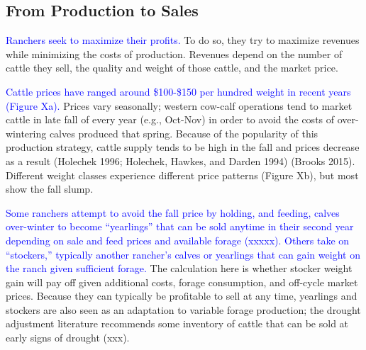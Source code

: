 \documentclass[11pt]{article}
\begin{document}
\subsection{From Production to Sales}
\textcolor{blue}{Ranchers seek to maximize their profits.}
 To do so, they try to maximize revenues while minimizing the costs of production. Revenues depend on the number of cattle they sell, the quality and weight of those cattle, and the market price. 
 
\textcolor{blue}{Cattle prices have ranged around \$100-\$150 per hundred weight in recent years (Figure Xa).}  Prices vary seasonally; western cow-calf operations tend to market cattle in late fall of every year (e.g., Oct-Nov) in order to avoid the costs of over-wintering calves produced that spring. Because of the popularity of this production strategy, cattle supply tends to be high in the fall and prices decrease as a result (Holechek 1996; Holechek, Hawkes, and Darden 1994) (Brooks 2015). Different weight classes experience different price patterns (Figure Xb), but most show the fall slump. 

\textcolor{blue}{Some ranchers attempt to avoid the fall price by holding, and feeding, calves over-winter to become ``yearlings'' that can be sold anytime in their second year depending on sale and feed prices and available forage (xxxxx). Others take on ``stockers,'' typically another rancher’s calves or yearlings that can gain weight on the ranch given sufficient forage.} 
The calculation here is whether stocker weight gain will pay off given additional costs, forage consumption, and off-cycle market prices.  
Because they can typically be profitable to sell at any time,
 yearlings and stockers are also seen as an adaptation to variable forage production; the drought adjustment literature recommends some inventory of cattle that can be sold at early signs of drought (xxx).
\end{document}
